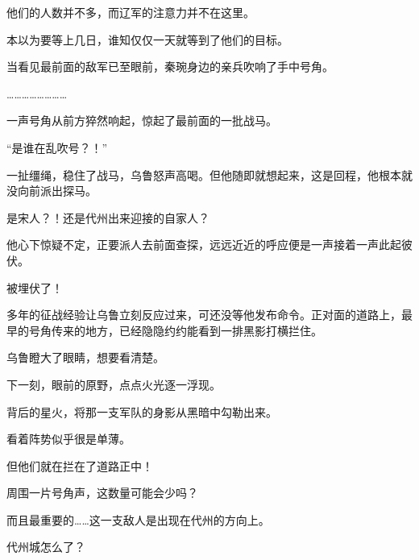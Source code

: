 他们的人数并不多，而辽军的注意力并不在这里。

本以为要等上几日，谁知仅仅一天就等到了他们的目标。

当看见最前面的敌军已至眼前，秦琬身边的亲兵吹响了手中号角。

……………………

一声号角从前方猝然响起，惊起了最前面的一批战马。

“是谁在乱吹号？！”

一扯缰绳，稳住了战马，乌鲁怒声高喝。但他随即就想起来，这是回程，他根本就没向前派出探马。

是宋人？！还是代州出来迎接的自家人？

他心下惊疑不定，正要派人去前面查探，远远近近的呼应便是一声接着一声此起彼伏。

被埋伏了！

多年的征战经验让乌鲁立刻反应过来，可还没等他发布命令。正对面的道路上，最早的号角传来的地方，已经隐隐约约能看到一排黑影打横拦住。

乌鲁瞪大了眼睛，想要看清楚。

下一刻，眼前的原野，点点火光逐一浮现。

背后的星火，将那一支军队的身影从黑暗中勾勒出来。

看着阵势似乎很是单薄。

但他们就在拦在了道路正中！

周围一片号角声，这数量可能会少吗？

而且最重要的……这一支敌人是出现在代州的方向上。

代州城怎么了？

